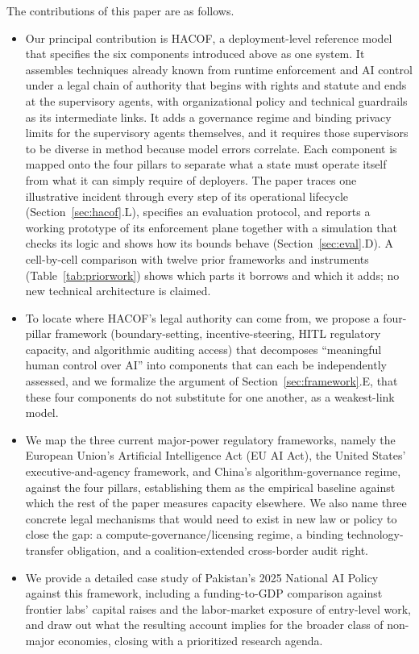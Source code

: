 \documentclass[journal]{IEEEtran}
\newcommand{\hacof}{HACOF}
\begin{document}
The contributions of this paper are as follows.
\begin{itemize}
  \item Our principal contribution is \hacof{}, a deployment-level reference model that specifies the six components introduced above as one system. It assembles techniques already known from runtime enforcement and AI control under a legal chain of authority that begins with rights and statute and ends at the supervisory agents, with organizational policy and technical guardrails as its intermediate links. It adds a governance regime and binding privacy limits for the supervisory agents themselves, and it requires those supervisors to be diverse in method because model errors correlate. Each component is mapped onto the four pillars to separate what a state must operate itself from what it can simply require of deployers. The paper traces one illustrative incident through every step of its operational lifecycle (Section~\ref{sec:hacof}.L), specifies an evaluation protocol, and reports a working prototype of its enforcement plane together with a simulation that checks its logic and shows how its bounds behave (Section~\ref{sec:eval}.D). A cell-by-cell comparison with twelve prior frameworks and instruments (Table~\ref{tab:priorwork}) shows which parts it borrows and which it adds; no new technical architecture is claimed.
  \item To locate where \hacof{}'s legal authority can come from, we propose a four-pillar framework (boundary-setting, incentive-steering, HITL regulatory capacity, and algorithmic auditing access) that decomposes ``meaningful human control over AI'' into components that can each be independently assessed, and we formalize the argument of Section~\ref{sec:framework}.E, that these four components do not substitute for one another, as a weakest-link model.
  \item We map the three current major-power regulatory frameworks, namely the European Union's Artificial Intelligence Act (EU AI Act), the United States' executive-and-agency framework, and China's algorithm-governance regime, against the four pillars, establishing them as the empirical baseline against which the rest of the paper measures capacity elsewhere. We also name three concrete legal mechanisms that would need to exist in new law or policy to close the gap: a compute-governance/licensing regime, a binding technology-transfer obligation, and a coalition-extended cross-border audit right.
  \item We provide a detailed case study of Pakistan's 2025 National AI Policy against this framework, including a funding-to-GDP comparison against frontier labs' capital raises and the labor-market exposure of entry-level work, and draw out what the resulting account implies for the broader class of non-major economies, closing with a prioritized research agenda.
\end{itemize}
\end{document}
